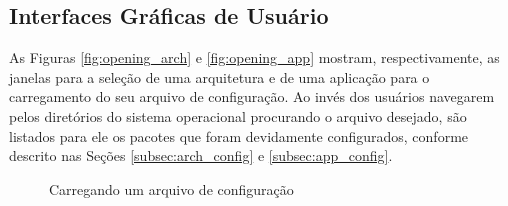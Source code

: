             
            
            
            \subsection{Interfaces Gráficas de Usuário} \label{subsec:rqt_mrta_interfaces}
            
            As Figuras \ref{fig:opening_arch} e \ref{fig:opening_app} mostram, respectivamente, as janelas para a seleção de uma arquitetura e de uma aplicação para o carregamento do seu arquivo de configuração. Ao invés dos usuários navegarem pelos diretórios do sistema operacional procurando o arquivo desejado, são listados para ele os pacotes que foram devidamente configurados, conforme descrito nas Seções \ref{subsec:arch_config} e \ref{subsec:app_config}.
            
            \begin{figure}[htb]
            \centering
            \caption{Carregando um arquivo de configuração} \label{fig:opening_config}
        \end{figure}
    
